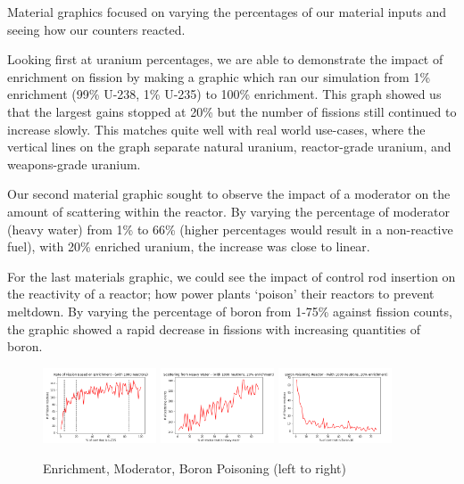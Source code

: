 \documentclass{notes}
\begin{document}
Material graphics focused on varying the percentages of our material inputs and seeing how our counters reacted.

Looking first at uranium percentages, we are able to demonstrate the impact of enrichment on fission by making a graphic which ran our simulation from 1\% enrichment (99\% U-238, 1\% U-235) to 100\% enrichment. This graph showed us that the largest gains stopped at 20\% but the number of fissions still continued to increase slowly. This matches quite well with real world use-cases, where the vertical lines on the graph separate natural uranium, reactor-grade uranium, and weapons-grade uranium.

Our second material graphic sought to observe the impact of a moderator on the amount of scattering within the reactor. By varying the percentage of moderator (heavy water) from 1\% to 66\% (higher percentages would result in a non-reactive fuel), with 20\% enriched uranium, the increase was close to linear.

For the last materials graphic, we could see the impact of control rod insertion on the reactivity of a reactor; how power plants `poison' their reactors to prevent meltdown. By varying the percentage of boron from 1-75\% against fission counts, the graphic showed a rapid decrease in fissions with increasing quantities of boron.

\begin{figure}[H]
    \centering
    \includegraphics[width = 0.3\textwidth]{enrichment.png}
    \includegraphics[width = 0.3\textwidth]{heavy_water.png}
    \includegraphics[width = 0.3\textwidth]{boron.png}
    \caption{Enrichment, Moderator, Boron Poisoning (left to right)}
\end{figure}
\end{document}
